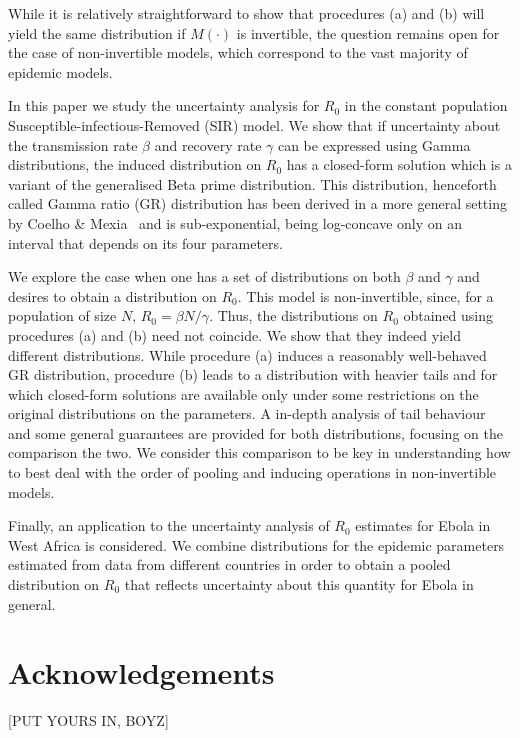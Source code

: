 \documentclass[11pt]{article}
\begin{document}
While it is relatively straightforward to show that procedures (a) and (b) will yield the same distribution if $M(\cdot)$ is invertible, the question remains open for the case of non-invertible models, which correspond to the vast majority of epidemic models.

In this paper we study the uncertainty analysis for $R_0$ in the constant population 	Susceptible-infectious-Removed (SIR) model.
We show that if uncertainty about the transmission rate $\beta$ and recovery rate $\gamma$ can be expressed using Gamma distributions, the induced distribution on $R_0$ has a closed-form solution which is a variant of the generalised Beta prime distribution.
This distribution, henceforth called Gamma ratio (GR) distribution has been derived in a more general setting by Coelho \& Mexia~\cite{Coelho2007} and is sub-exponential, being log-concave only on an interval that depends on its four parameters.%

We explore the case when one has a set of distributions on both $\beta$ and $\gamma$ and desires to obtain a distribution on $R_0$.
This model is non-invertible, since, for a population of size $N$,  $R_0 = \beta N/\gamma$.
Thus, the distributions on $R_0$ obtained using procedures (a) and (b) need not coincide. %
We show that they indeed yield different distributions.
While procedure (a) induces a reasonably well-behaved GR distribution, procedure (b) leads to a distribution with heavier tails and for which closed-form solutions are available only under some restrictions on the original distributions on the parameters.
A in-depth analysis of tail behaviour and some general guarantees are provided for both distributions, focusing on the comparison the two.
We consider this comparison to be key in understanding how to best deal with the order of pooling and inducing operations in non-invertible models.

Finally, an application to the uncertainty analysis of $R_0$ estimates for Ebola in West Africa is considered.
We combine distributions for the epidemic parameters estimated from data from different countries in order to obtain a pooled distribution on $R_0$ that reflects uncertainty about this quantity for Ebola in general.

\section*{Acknowledgements}
[PUT YOURS IN, BOYZ]


\end{document}
